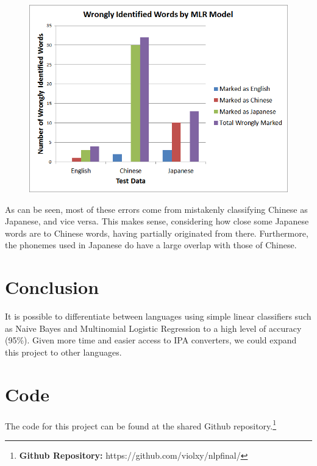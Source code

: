 \documentclass[a4paper]{article}
\begin{document}
\begin{figure}[H]
\centering
\includegraphics[width=\textwidth]{mlrgraph.png}
\end{figure}
As can be seen, most of these errors come from mistakenly classifying Chinese as Japanese, and vice versa. This makes sense, considering how close some Japanese words are to Chinese words, having partially originated from there. Furthermore, the phonemes used in Japanese do have a large overlap with those of Chinese.
\section{Conclusion}
It is possible to differentiate between languages using simple linear classifiers such as Naive Bayes and Multinomial Logistic Regression to a high level of accuracy (95\%). Given more time and easier access to IPA converters, we could expand this project to other languages.\\
\section{Code}
The code for this project can be found at the shared Github repository.\footnote{\textbf{Github Repository: }https://github.com/violxy/nlpfinal/}
\end{document}
